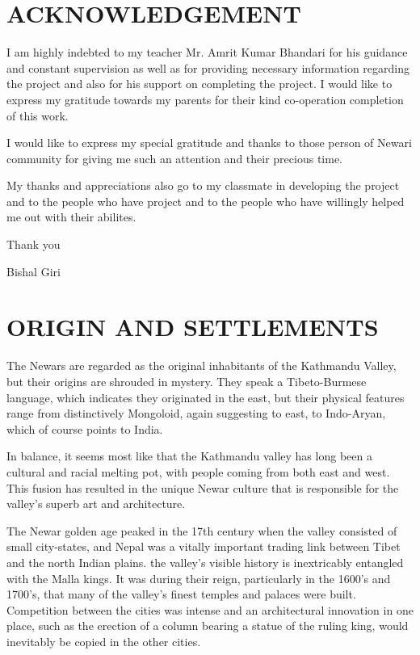 \documentclass[a4paper,13pt, margin=0.9in]{article}
\begin{document}
\begin{flushleft}
\section*{ACKNOWLEDGEMENT}
I am highly indebted to my teacher Mr. Amrit Kumar Bhandari for his guidance and constant supervision as well as for providing necessary information regarding the project and also for his support on completing the project. I would like to express my gratitude towards my parents for their kind co-operation completion of this work.
\vskip0.5cm 
	
	
	I would like to express my special gratitude and thanks to those person of Newari community for giving me such an attention and their precious time.
	\vskip0.5cm 
	
	My thanks and appreciations also go to my classmate in developing the project and to the people who have project  and to the people who have willingly helped me out with their abilites.
	\vskip0.5cm 
	
	Thank you 
	
	



\begin{flushright}
		Bishal Giri
\end{flushright}


\newpage
\tableofcontents

\newpage

\section{ORIGIN AND SETTLEMENTS}

	The Newars are regarded as the original inhabitants of the Kathmandu Valley, but their origins are shrouded in mystery. They speak a Tibeto-Burmese language, which indicates they originated in the east, but their physical features range from distinctively Mongoloid, again suggesting to east, to Indo-Aryan, which of course points to India.
	\vskip0.5cm 

In balance, it seems most like that the Kathmandu valley has long been a cultural and racial melting pot, with people coming from both east and west. This fusion has resulted in the unique Newar culture that is responsible for the valley's superb art and architecture.
\vskip0.5cm 

The Newar golden age peaked in the 17th century when the valley consisted of small city-states, and Nepal was a vitally important trading link between Tibet and the north Indian plains. the valley's visible history is inextricably entangled with the Malla kings. It was during their reign, particularly in the 1600's and 1700's, that many of the valley's finest temples and palaces were built. Competition between the cities was intense and an architectural innovation in one place, such as the erection of a column bearing a statue of the ruling king, would inevitably be copied in the other cities.
\vskip0.5cm 


\end{flushleft}
\end{document}
